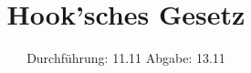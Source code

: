 

\subject{vProbe}
\title{Hook'sches Gesetz}
\date{%
  Durchführung: 11.11
  \hspace{3em}
  Abgabe: 13.11
}



\maketitle
\thispagestyle{empty}
\tableofcontents
\newpage




%

\printbibliography{}

